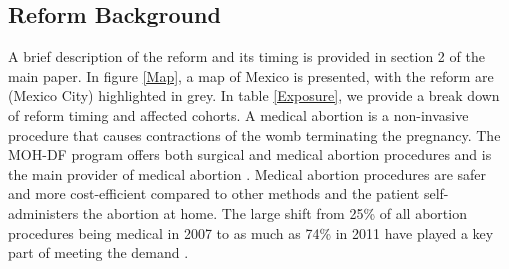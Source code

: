\documentclass[a4paper, 11pt]{article}
\begin{document}
\begin{spacing}{1.4}
\subsection{Reform Background}
A brief description of the reform and its timing is provided in section 2 of the main
paper.  In figure \ref{Map}, a map of Mexico is presented, with the reform are (Mexico
City) highlighted in grey.  In table \ref{Exposure}, we provide a break down of reform
timing and affected cohorts.  A medical abortion is a non-invasive procedure that causes
contractions of the womb terminating the pregnancy. The MOH-DF program offers both
surgical and medical abortion procedures and is the main provider of medical abortion
\citep{WinikoffSheldon2012}. Medical abortion procedures are safer and more
cost-efficient compared to other methods and the patient self-administers the abortion
at home. The large shift from 25\% of all abortion procedures being medical in 2007 to
as much as 74\% in 2011 have played a key part of meeting the demand \citep{Becker2013}.


\end{spacing}
\end{document}
